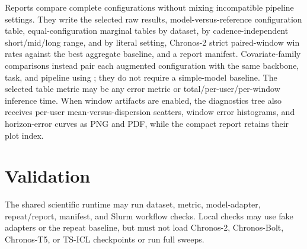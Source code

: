 \documentclass[10pt,a4paper]{article}
\newcommand{\code}[1]{\texttt{\detokenize{#1}}}
\begin{document}
Reports compare complete configurations without mixing incompatible pipeline
settings. They write the selected raw results, model-versus-reference
configuration table, equal-configuration marginal tables by dataset, by
cadence-independent short/mid/long range, and by literal setting, Chronos-2
strict paired-window win rates against the best aggregate
baseline, and a report manifest. Covariate-family comparisons instead pair
each augmented configuration with the same backbone, task, and pipeline using
\code{covariate_mode=none}; they do not require a simple-model baseline. The
selected table metric may be any error
metric or total/per-user/per-window inference time. When window artifacts are
enabled, the diagnostics tree also receives per-user mean-versus-dispersion
scatters, window error histograms, and horizon-error curves as PNG and PDF,
while the compact report retains their plot index.

\vspace{0.5\baselineskip}
\section{Validation}
The shared scientific runtime may run dataset, metric, model-adapter,
repeat/report, manifest, and Slurm workflow checks. Local checks may use fake
adapters or the repeat baseline, but must not load Chronos-2, Chronos-Bolt,
Chronos-T5, or TS-ICL checkpoints or run full sweeps.
\end{document}
